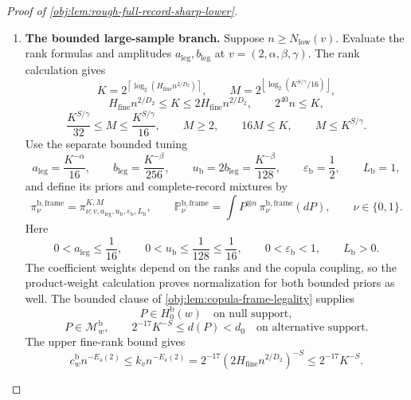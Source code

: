 \begin{proof}[Proof of \cref{obj:lem:rough-full-record-sharp-lower}]
\begin{enumerate}
\item \textbf{The bounded large-sample branch.}
Suppose \(n\ge N_{\mathrm{low}}(v)\). Evaluate the rank formulas and amplitudes \(a_{\mathrm{leg}},b_{\mathrm{leg}}\) at \(v=(2,\alpha,\beta,\gamma)\). The rank calculation gives
\[
K=
2^{\left\lceil\log_2(H_{\mathrm{fine}}n^{2/D_2})\right\rceil},
\qquad
M=
2^{\left\lfloor\log_2(K^{S/\gamma}/16)\right\rfloor},
\]
\[
H_{\mathrm{fine}}n^{2/D_2}\le K
\le2H_{\mathrm{fine}}n^{2/D_2},
\qquad
2^{40}n\le K,
\]
\[
\frac{K^{S/\gamma}}{32}\le M
\le\frac{K^{S/\gamma}}{16},
\qquad
M\ge2,\qquad16M\le K,\qquad M\le K^{S/\gamma}.
\]
Use the separate bounded tuning
\[
a_{\mathrm{leg}}=\frac{K^{-\alpha}}{16},
\qquad
b_{\mathrm{leg}}=\frac{K^{-\beta}}{256},
\qquad
u_{\mathrm b}=2b_{\mathrm{leg}}=\frac{K^{-\beta}}{128},
\qquad
\varepsilon_{\mathrm b}=\frac12,
\qquad
L_{\mathrm b}=1,
\]
and define its priors and complete-record mixtures by
\[
\pi_\nu^{\mathrm{b,frame}}
=
\pi^{K,M}_{\nu;v,a_{\mathrm{leg}},u_{\mathrm b},\varepsilon_{\mathrm b},L_{\mathrm b}},
\qquad
\mathbb P_\nu^{\mathrm{b,frame}}
=
\int P^{\otimes n}\,\pi_\nu^{\mathrm{b,frame}}(dP),
\qquad \nu\in\{0,1\}.
\]
Here
\[
0<a_{\mathrm{leg}}\le\frac1{16},
\qquad
0<u_{\mathrm b}\le\frac1{128}\le\frac1{16},
\qquad
0<\varepsilon_{\mathrm b}<1,
\qquad L_{\mathrm b}>0.
\]
The coefficient weights depend on the ranks and the copula coupling, so the product-weight calculation proves normalization for both bounded priors as well. The bounded clause of
\cref{obj:lem:copula-frame-legality} supplies
\[
P\in H_0^{\mathrm b}(w)
\quad\text{on null support},
\]
\[
P\in\mathcal M_w^{\mathrm b},
\qquad
2^{-17}K^{-S}\le d(P)<d_0
\quad\text{on alternative support}.
\]
The upper fine-rank bound gives
\[
c_w^{\mathrm b}n^{-E_4(2)}
\le k_vn^{-E_4(2)}
=
2^{-17}(2H_{\mathrm{fine}}n^{2/D_2})^{-S}
\le2^{-17}K^{-S}.
\]


\end{enumerate}
\end{proof}
